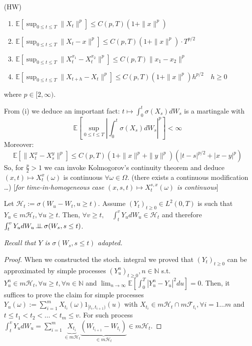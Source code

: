  (HW)

\begin{enumerate}
    \item[(i)] $\mathbb{E}\left[\sup_{0 \le t \le T} \|X_t\|^p\right] \le C(p,T)(1 + \|x\|^p)$
    \item[(ii)] $\mathbb{E}\left[\sup_{0 \le t \le T} \|X_t - x\|^p\right] \le C(p,T)(1 + \|x\|^p) \cdot T^{p/2}$
    \item[(iii)] $\mathbb{E}\left[\sup_{0 \le t \le T} \|X_t^{x_1} - X_t^{x_2}\|^p\right] \le C(p,T)\|x_1 - x_2\|^p$
    \item[(iv)] $\mathbb{E}\left[\sup_{0 \le t \le T} \|X_{t+h} - X_t\|^p\right] \le C(p,T)(1 + \|x\|^p)h^{p/2} \quad h \ge 0$
\end{enumerate}
where $p \in [2, \infty)$.

From (i) we deduce an important fact:
$t \mapsto \int_0^t \sigma(X_s)dW_s$ is a martingale with
$$\mathbb{E}\left[\sup_{0 \le t \le T} \left|\int_0^t \sigma(X_s)dW_s\right|^p\right] < \infty$$
Moreover:
$$\mathbb{E}[\|X_t^x - X_s^y\|^p] \le C(p,T)(1 + \|x\|^p + \|y\|^p)(|t-s|^{p/2} + |x-y|^p)$$
So, for $\frac{p}{2} > 1$ we can invoke Kolmogorov's continuity theorem and deduce $(x,t) \mapsto X_t^x(\omega)$ is continuous $\forall \omega \in \Omega$.
(there exists a continuous modification \dots) [\textit{for time-in-homogeneous case $(x,s,t) \mapsto X_t^{s,x}(\omega)$ is continuous}]

\begin{lemma}
    Let $\mathcal{H}_t := \sigma(W_u - W_t, u \ge t)$. Assume $(Y_t)_{t \ge 0} \in L^2(0,T)$ is such that $Y_u \in m\mathcal{H}_t, \forall u \ge t$. Then,
    $\forall v \ge t, \quad \int_t^v Y_u dW_u \in \mathcal{H}_t$ and therefore $\int_t^v Y_u dW_u \operatorname{\perp\!\!\!\perp} \sigma(W_s, s \le t)$.
    
    \textit{Recall that $Y$ is $\sigma(W_s, s \le t)$ adapted.}
\end{lemma}

\begin{proof}
    When we constructed the stoch. integral we proved that $(Y_t)_{t \ge 0}$ can be approximated by simple processes $(Y_u^n)_{t \ge 0}, n \in \mathbb{N}$ s.t. $Y_u^n \in m\mathcal{H}_t, \forall u \ge t, \forall n \in \mathbb{N}$ and $\lim_{n \to \infty} \mathbb{E}[\int_0^T |Y_u^n - Y_u|^2 du] = 0$.
    Then, it suffices to prove the claim for simple processes $Y_u(\omega) := \sum_{i=1}^m X_{t_i}(\omega) 1_{[t_i, t_{i+1})}(u)$ with $X_{t_i} \in m\mathcal{H}_t \cap m\mathcal{F}_{t_i}, \forall i=1 \dots m$ and $t \le t_1 < t_2 < \dots < t_m \le v$.
    For such process $\int_t^v Y_u dW_u = \sum_{i=1}^m \underbrace{X_{t_i}}_{\in m\mathcal{H}_t} \underbrace{(W_{t_{i+1}} - W_{t_i})}_{\in m\mathcal{H}_t} \in m\mathcal{H}_t$.
\end{proof}

